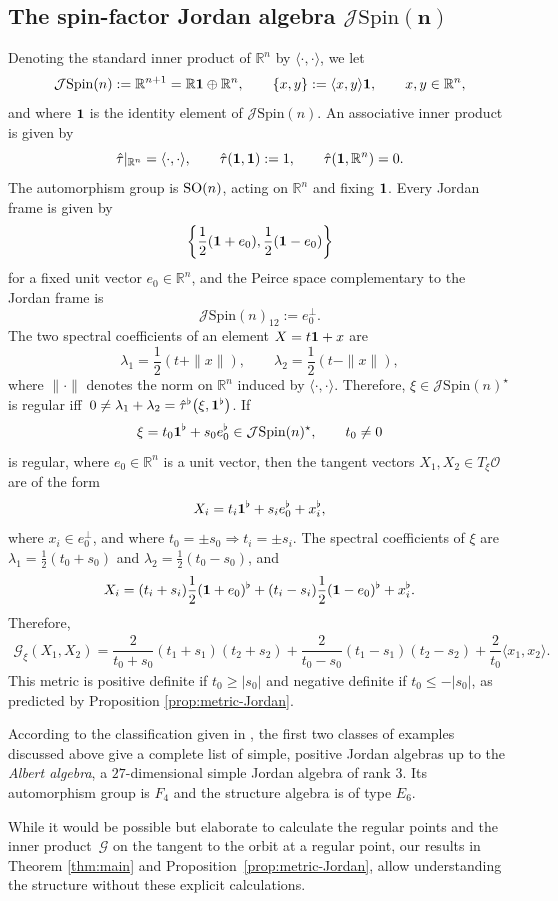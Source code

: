 \documentclass[pdftex]{sigma}
\numberwithin{equation}{section}
\newcommand{\ocal}{\mathcal{O}}
\newcommand{\R}{{\mathbb R}}
\newcommand{\Jspin}{{\mathcal{J}\mathrm{Spin}}}
\newcommand{\Gcal}{\mathcal{G}}
\begin{document}
\subsection[The spin-factor Jordan algebra Jspin(n)]{The spin-factor Jordan algebra $\boldsymbol{\Jspin(n)}$}

Denoting the standard inner product of $\R^n$ by $\langle \cdot, \cdot \rangle$, we let
\[
\Jspin(n) := \R^{n+1} = \R {\bf 1} \oplus \R^n, \qquad \{x,y\} := \langle x,y\rangle {\bf 1}, \qquad x,y \in \R^n,
\]
and where ${\bf 1}$ is the identity element of $\Jspin(n)$. An associative inner product is given by
\[
\hat \tau|_{\R^n} = \langle \cdot, \cdot \rangle, \qquad \hat \tau({\bf 1}, {\bf 1}) := 1, \qquad \hat \tau({\bf 1}, \R^n) = 0.
\]
The automorphism group is ${\rm SO}(n)$, acting on $\R^n$ and fixing ${\bf 1}$. Every Jordan frame is given by
\[
\left\{ \dfrac12({\bf 1} + e_0), \dfrac12 ({\bf 1} - e_0)\right\}
\]
for a fixed unit vector $e_0 \in \R^n$, and the Peirce space complementary to the Jordan frame is
\[
\Jspin(n)_{12} := e_0^\perp.
\]
The two spectral coefficients of an element $X = t {\bf 1} + x$ are
\[
\lambda_1 = \frac 12 (t+ \|x\|), \qquad \lambda_2 = \frac 12 (t- \|x\|),
\]
where $\|\cdot\|$ denotes the norm on $\R^n$ induced by $\langle \cdot, \cdot \rangle$. Therefore, $\xi \in \Jspin(n)^\star$ is regular iff~$0 \neq \lambda_1 + \lambda_2 = \hat \tau^\flat\big(\xi, {\bf 1}^\flat\big)$. If
\[
\xi = t_0 {\bf 1}^\flat + s_0 e_0^\flat \in \Jspin(n)^\star, \qquad t_0 \neq 0
\]
is regular, where $e_0 \in \R^n$ is a unit vector, then the tangent vectors $X_1, X_2 \in T_\xi \ocal$ are of the form
\[
X_i = t_i {\bf 1}^\flat + s_i e_0^\flat + x_i^\flat,
\]
where $x_i \in e_0^\perp$, and where $t_0 = \pm s_0 \Rightarrow t_i = \pm s_i$. The spectral coefficients of $\xi$ are $\lambda_1 = \frac12(t_0+s_0)$ and $\lambda_2 = \frac12(t_0-s_0)$, and
\[
X_i = (t_i+s_i) \frac12({\bf 1} + e_0)^\flat + (t_i-s_i) \frac12({\bf 1} - e_0)^\flat + x_i^\flat.
\]
Therefore,
\begin{align*}
\Gcal_\xi(X_1, X_2) = \dfrac 2{t_0 + s_0} (t_1 + s_1)(t_2 + s_2) + \dfrac 2{t_0 - s_0} (t_1 - s_1)(t_2 - s_2) + \dfrac2{t_0} \langle x_1, x_2 \rangle.
\end{align*}
This metric is positive definite if $t_0 \geq |s_0|$ and negative definite if $t_0 \leq -|s_0|$, as predicted by Proposition \ref{prop:metric-Jordan}.

\begin{Remark}
According to the classification given in \cite[Theorem V.3.7]{F-K-1994}, the first two classes of examples discussed above give a complete list of simple, positive Jordan algebras up to the {\em Albert algebra}, a $27$-dimensional simple Jordan algebra of rank $3$. Its automorphism group is $F_4$ and the structure algebra is of type $E_6$.

While it would be possible but elaborate to calculate the regular points and the inner product~$\Gcal$ on the tangent to the orbit at a regular point, our results in Theorem \ref{thm:main} and Proposition~\ref{prop:metric-Jordan}, allow understanding the structure without these explicit calculations.
\end{Remark}
\end{document}
